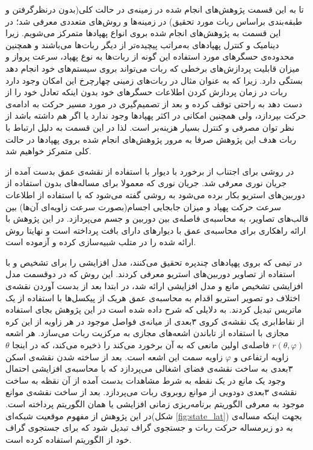 تا به این قسمت پژوهش‌های انجام شده در زمینه‌ی  در حالت کلی(بدون درنظرگرفتن و طبقه‌بندی براساس ربات مورد تحقیق) در زمینه‌ها و روش‌های متعددی معرفی شد؛ در این قسمت به پژوهش‌های انجام شده بروی انواع پهپادها متمرکز می‌شویم. زیرا دینامیک و کنترل پهپادهای به‌مراتب پیچیده‌تر از دیگر ربات‌ها می‌باشند و همچنین محدوده‌ی حسگرهای مورد استفاده این گونه از ربات‌ها به نوع پهپاد، سرعت پرواز و میزان قابلیت پردازش‌های برخطی که ربات می‌تواند بروی سیستم‌های خود انجام دهد بستگی دارد. زیرا که به عنوان مثال در ربات‌های زمینی چهارچرخ این امکان وجود دارد ربات در زمان پردازش کردن اطلاعات حسگرهای خود بدون اینکه تعادل خود را از دست دهد به راحتی توقف کرده و بعد از تصمیم‌گیری در مورد مسیر حرکت به ادامه‌ی حرکت بپردازد، ولی همچنین امکانی در اکثر پهپادها وجود ندارد یا اگر هم داشته باشد از نظر توان مصرفی و کنترل بسیار هزینه‌بر است. لذا در این قسمت به دلیل ارتباط با ربات هدف این پژوهش صرفا به مرور پژوهش‌های انجام شده بروی پهپادها در حالت کلی متمرکز خواهیم شد.

در  روشی برای اجتناب از برخورد با دیوار با استفاده از نقشه‌ی عمق بدست آمده از جریان نوری معرفی شد. جریان نوری که معمولا برای مساله‌های  بدون استفاده از دوربین‌های استریو بکار برده می‌شود به روشی گفته می‌شود که با استفاده از اطلاعات سرعت حرکت پهپاد و میزان جابجایی اجسام(بصورت سرعت زاویه‌ای آن‌ها) بین قالب‌های تصاویر، به محاسبه‌ی فاصله‌ی بین دوربین و جسم می‌پردازد. در این پژوهش با ارائه راهکاری برای محاسبه‌ی عمق با دیوارهای دارای بافت پرداخته است و نهایتا روش ارائه شده را در متلب شبیه‌سازی کرده و آزموده است.

در  تیمی که بروی پهپادهای چندپره تحقیق می‌کنند، مدل افزایشی را برای تشخیص و  با استفاده از تصاویر دوربین‌های استریو معرفی کردند. این روش که در دوقسمت مدل افزایشی تشخیص مانع و مدل افزایشی  ارائه شد، در ابتدا بعد از بدست آوردن نقشه‌ی اختلاف دو تصویر استریو اقدام به محاسبه‌ی عمق هریک از پیکسل‌ها با استفاده از یک ماتریس تبدیل کردند. به دلایلی که شرح داده شده است در این پژوهش بجای استفاده از نقاط‌ابری یک نقشه‌ی کروی ۳بعدی از میانه‌ی فواصل موجود در هر زاویه‌ از این کره مجازی با استفاده از تاباندن اشعه‌های مجازی به مرکزیت ربات می‌سازد. هر اشعه $r(\theta, \varphi)$ فاصله‌ی اولین مانعی که به آن برخورد می‌کند را ذخیره می‌کند، که در اینجا $\theta$ زاویه ارتفاعی و $\varphi$ زاویه سمت این اشعه است. بعد از ساخته شدن نقشه‌ی اسکن ۳بعدی به ساخت نقشه‌ی فضای اشغالی می‌پردازد که با محاسبه‌ی افزایشی احتمال وجود یک مانع در یک نقطه به شرط مشاهدات بدست آمده از آن نقظه به ساخت نقشه‌ی ۳بعدی دودویی از موانع روبروی ربات می‌پردازد. بعد از ساخت نقشه‌ی موانع موجود به معرفی الگوریتم برنامه‌ریزی زمانی افزایشی یا همان الگوریتم  پرداخته است. در این پژوهش از مفهوم موقعیت شبکه‌ای(شکل \ref{fig:state_lat}) بجهت اینکه مساله‌ی  به دو زیرمساله حرکت ربات و جستجوی گراف تبدیل شود که برای جستجوی گراف خود از الگوریتم  استفاده کرده است.

